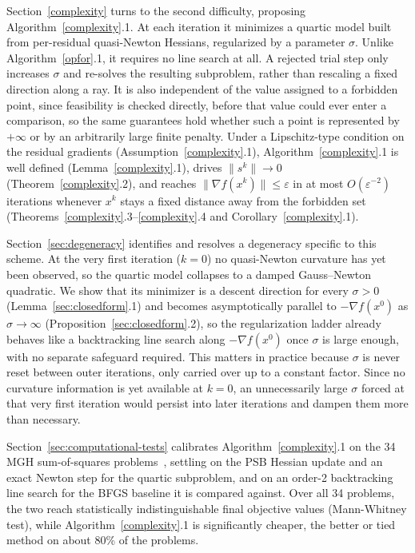 \documentclass{article}
\begin{document}
Section~\ref{complexity} turns to the second difficulty, proposing
Algorithm~\ref{complexity}.1. At each
iteration it minimizes a quartic model built from per-residual
quasi-Newton Hessians, regularized by a parameter $\sigma$. Unlike
Algorithm~\ref{opfor}.1, it requires no line search at all. A rejected
trial step only increases $\sigma$ and re-solves the resulting
subproblem, rather than rescaling a fixed direction along a ray. It is
also independent of the value assigned to a forbidden point, since
feasibility is checked directly, before that value could ever enter a
comparison, so the same guarantees hold whether such a point is
represented by $+\infty$ or by an arbitrarily large finite penalty.
Under a Lipschitz-type condition on the residual gradients
(Assumption~\ref{complexity}.1), Algorithm~\ref{complexity}.1 is well
defined (Lemma~\ref{complexity}.1), drives $\|s^k\|\to0$
(Theorem~\ref{complexity}.2), and reaches
$\|\nabla f(x^k)\|\le\varepsilon$ in at most $O(\varepsilon^{-2})$
iterations whenever $x^k$ stays a fixed distance away from the
forbidden set (Theorems~\ref{complexity}.3--\ref{complexity}.4 and
Corollary~\ref{complexity}.1).

Section~\ref{sec:degeneracy} identifies and resolves a degeneracy
specific to this scheme. At the very first iteration ($k=0$) no
quasi-Newton curvature has yet been observed, so the quartic model
collapses to a damped Gauss--Newton quadratic. We show that its
minimizer is a descent direction for every $\sigma>0$
(Lemma~\ref{sec:closedform}.1) and becomes asymptotically parallel to
$-\nabla f(x^0)$ as $\sigma\to\infty$ (Proposition~\ref{sec:closedform}.2),
so the regularization ladder already behaves like a backtracking line
search along $-\nabla f(x^0)$ once $\sigma$ is large enough, with no
separate safeguard required. This matters in practice because $\sigma$
is never reset between outer iterations, only carried over up to a
constant factor. Since no curvature information is yet available at
$k=0$, an unnecessarily large $\sigma$ forced at that very first
iteration would persist into later iterations and dampen them more
than necessary.


Section~\ref{sec:computational-tests} calibrates Algorithm~\ref{complexity}.1
on the 34 MGH sum-of-squares problems~\cite{MoreGarbowHillstrom1981},
settling on the PSB Hessian update and an exact Newton step for the
quartic subproblem, and on an order-2 backtracking line search for the
BFGS baseline it is compared against. Over all 34 problems, the two
reach statistically indistinguishable final objective values
(Mann-Whitney test), while Algorithm~\ref{complexity}.1 is
significantly cheaper, the better or tied method on about 80\% of the
problems.
\end{document}
